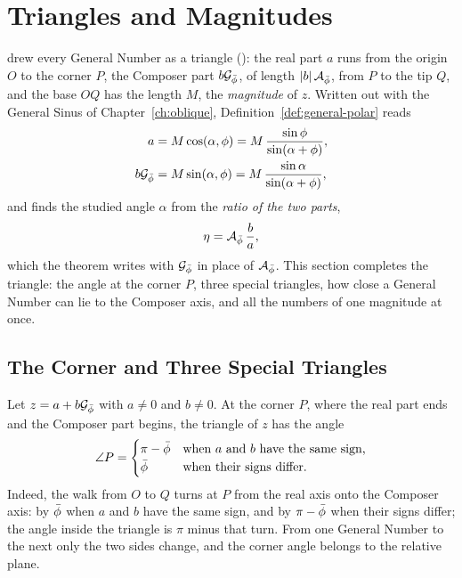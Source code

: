 \section{Triangles and Magnitudes}\label{sec:gn-triangle-words}

 drew every General Number as a triangle (): the real part $a$ runs from the origin $O$ to the corner $P$, the Composer part $b\mathcal{G}_{\bar{\phi}}$, of length $|b|\,\mathcal{A}_{\bar{\phi}}$, from $P$ to the tip $Q$, and the base $OQ$ has the length $M$, the \emph{magnitude} of $z$. Written out with the General Sinus of Chapter~\ref{ch:oblique}, Definition~\ref{def:general-polar} reads
\begin{align*}
a &= M\cos(\alpha, \phi) = M\,\frac{\sin\phi}{\sin(\alpha + \phi)}, \\
b\mathcal{G}_{\bar{\phi}} &= M\sin(\alpha, \phi) = M\,\frac{\sin\alpha}{\sin(\alpha + \phi)},
\end{align*}
and  finds the studied angle $\alpha$ from the \emph{ratio of the two parts},
\[
\eta = \mathcal{A}_{\bar{\phi}}\,\frac{b}{a} ,
\]
which the theorem writes with $\mathcal{G}_{\bar{\phi}}$ in place of $\mathcal{A}_{\bar{\phi}}$. This section completes the triangle: the angle at the corner $P$, three special triangles, how close a General Number can lie to the Composer axis, and all the numbers of one magnitude at once.

\subsection{The Corner and Three Special Triangles}\label{subsec:gn-corner}

\begin{remark}\label{rem:corner}
Let $z = a + b\mathcal{G}_{\bar{\phi}}$ with $a \neq 0$ and $b \neq 0$. At the corner $P$, where the real part ends and the Composer part begins, the triangle of $z$ has the angle
\[
\angle P = \begin{cases} \pi - \bar{\phi} & \text{when $a$ and $b$ have the same sign,} \\ \bar{\phi} & \text{when their signs differ.} \end{cases}
\]
Indeed, the walk from $O$ to $Q$ turns at $P$ from the real axis onto the Composer axis: by $\bar{\phi}$ when $a$ and $b$ have the same sign, and by $\pi - \bar{\phi}$ when their signs differ; the angle inside the triangle is $\pi$ minus that turn. From one General Number to the next only the two sides change, and the corner angle belongs to the relative plane.
\end{remark}

